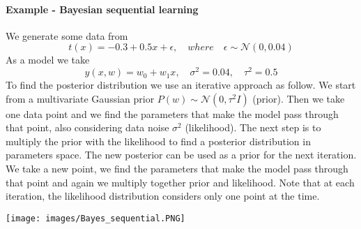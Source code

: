 \documentclass[../main.tex]{subfiles}
\begin{document}
\newpage
\paragraph{Example - Bayesian sequential learning}
We generate some data from
\begin{equation*}
    t(x) = -0.3 + 0.5x + \epsilon, \quad where \quad \epsilon \sim \mathcal{N}(0,0.04)
\end{equation*}
As a model we take
\begin{equation*}
    y(x,w) = w_0+w_1x, \quad \sigma^2=0.04, \quad \tau^2=0.5
\end{equation*}
To find the posterior distribution we use an iterative approach as follow.
We start from a multivariate Gaussian prior $P(w) \sim \mathcal{N}(0,\tau^2 I)$ (prior). Then we take one data point and we find the parameters that make the model pass through that point, also considering data noise $\sigma^2$ (likelihood). The next step is to multiply the prior with the likelihood to find a posterior distribution in parameters space. The new posterior can be used as a prior for the next iteration. We take a new point, we find the parameters that make the model pass through that point and again we multiply together prior and likelihood. Note that at each iteration, the likelihood distribution considers only one point at the time.
\begin{center}
    \texttt{[image: images/Bayes\_sequential.PNG]}
\end{center}

\newpage
\end{document}
